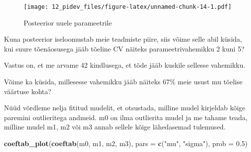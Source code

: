\documentclass[]{book}
\newenvironment{Shaded}{\begin{snugshade}}{\end{snugshade}}
\newcommand{\CommentTok}[1]{\textcolor[rgb]{0.56,0.35,0.01}{\textit{#1}}}
\newcommand{\DataTypeTok}[1]{\textcolor[rgb]{0.13,0.29,0.53}{#1}}
\newcommand{\DecValTok}[1]{\textcolor[rgb]{0.00,0.00,0.81}{#1}}
\newcommand{\FloatTok}[1]{\textcolor[rgb]{0.00,0.00,0.81}{#1}}
\newcommand{\KeywordTok}[1]{\textcolor[rgb]{0.13,0.29,0.53}{\textbf{#1}}}
\newcommand{\NormalTok}[1]{#1}
\newcommand{\OperatorTok}[1]{\textcolor[rgb]{0.81,0.36,0.00}{\textbf{#1}}}
\newcommand{\StringTok}[1]{\textcolor[rgb]{0.31,0.60,0.02}{#1}}
\begin{document}
\begin{figure}
\centering
\texttt{[image: 12\_pidev\_files/figure-latex/unnamed-chunk-14-1.pdf]}
\caption{\label{fig:unnamed-chunk-14}Posteerior uuele parameetrile}
\end{figure}

Kuna posteerior iseloomustab meie teadmiste piire, siis võime selle abil küsida, kui suure tõenäosusega jääb tõeline CV näiteks parameetrivahemikku 2 kuni 5?

\begin{Shaded}
\end{Shaded}

Vastus on, et me arvame 42 kindlusega, et tõde jääb kuskile sellesse vahemikku.

Võime ka küsida, millesesse vahemikku jääb näiteks 67\% meie usust mu tõelise väärtuse kohta?

\begin{Shaded}
\end{Shaded}

Nüüd võrdleme nelja fititud mudelit, et otsustada, milline mudel kirjeldab kõige paremini outlieritega andmeid.
m0 on ilma outlierita mudel ja me tahame teada, milline mudel m1, m2 või m3 annab sellele kõige lähedasemad tulemused.

\begin{Shaded}
\begin{Highlighting}[]
\KeywordTok{coeftab_plot}\NormalTok{(}\KeywordTok{coeftab}\NormalTok{(m0, m1, m2, m3), }
             \DataTypeTok{pars =} \KeywordTok{c}\NormalTok{(}\StringTok{"mu"}\NormalTok{, }\StringTok{"sigma"}\NormalTok{), }
             \DataTypeTok{prob =} \FloatTok{0.5}\NormalTok{)}
\end{Highlighting}
\end{Shaded}
\end{document}
